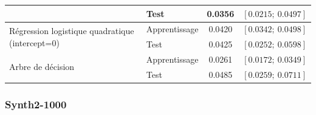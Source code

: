 \documentclass{article}
\begin{document}
\begin{table}[H]
\begin{tabular}{l|l|cc}
                                       & Test             & 0.0356                                & $\left[0.0215;~ 0.0497 \right]$ \\ \hline
\multirow{2}{*}{Régression logistique quadratique (intercept=0)}                  & Apprentissage    & 0.0420                            & $\left[0.0342 ;~ 0.0498\right]$  \\
                                       & Test             & 0.0425                                 & $\left[0.0252 ;~ 0.0598 \right]$ \\ \hline      
\multirow{2}{*}{Arbre de décision}                  & Apprentissage    & 0.0261                             & $\left[0.0172 ;~  0.0349 \right]$  \\
                                       & Test             & 0.0485                                 & $\left[0.0259 ;~ 0.0711 \right]$ 
\end{tabular}


\label{err_1-1000}
\end{table}









\subsubsection{Synth2-1000}
\end{document}
